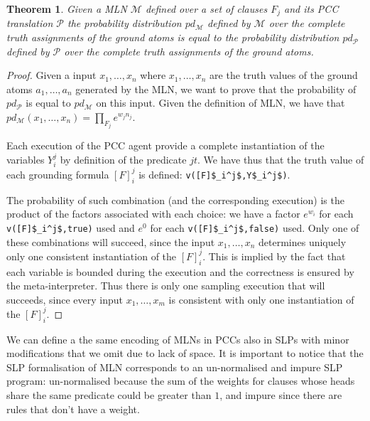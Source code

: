\documentclass[letterpaper]{article}
\theoremstyle{plain}
\newtheorem{theorem}{Theorem}[section]
\theoremstyle{definition}
\theoremstyle{remark}
\theoremstyle{definition}
\begin{document}
\begin{theorem}
Given a MLN $\mathcal{M}$ defined over a set of clauses $F_j$ and its PCC translation $\mathcal{P}$ 
the probability distribution $pd_{\mathcal{M}}$ defined by $\mathcal{M}$ over the complete truth assignments of the ground atoms  is equal to the probability distribution $pd_{\mathcal{P}}$ defined by $\mathcal{P}$ over the complete truth assignments of the ground atoms.
\end{theorem}
\begin{proof}
Given a input $x_1, \ldots ,x_n$ where $x_1, \ldots , x_n$ are the truth values of the ground atoms $a_1,\ldots, a_n$ generated by the MLN, we want to prove that the probability of $pd_{\mathcal{P}}$ is equal to $pd_{\mathcal{M}}$ on this input. Given the definition of MLN, we have that $pd_{\mathcal{M}}(x_1, \ldots ,x_n)=\prod_{F_j} e^{w_j n_j}$.

Each execution of the PCC agent provide a complete instantiation of the variables $Y_i^j$ by definition of the predicate $jt$. We have thus that the truth value of each grounding formula $[F]_i^j$ is defined: \lstinline[mathescape=true]{v([F]$_i^j$,Y$_i^j$)}. 

The probability of such combination (and the corresponding execution) is the product of the factors associated with each choice: we have a factor $e^{w_i}$ for each \lstinline[mathescape=true]{v([F]$_i^j$,true)} used and $e^0$ for each \lstinline[mathescape=true]{v([F]$_i^j$,false)} used. Only one of these combinations will succeed, since the input $x_1, \ldots ,x_n$ determines uniquely only one consistent instantiation of the $[F]_i^j$. This is implied by the fact that each variable is bounded during the execution and the correctness is ensured by the meta-interpreter.
Thus there is only one sampling execution that will succeeds, since every input $x_1,\ldots,x_m$ is consistent with only one instantiation of the $[F]_i^j$.
\end{proof}



We can define a the same encoding of MLNs in PCCs also in SLPs with minor modifications that we omit due to lack of space. It is important to notice that the SLP formalisation of MLN corresponds to an un-normalised and impure SLP program: un-normalised because the sum of the weights for clauses whose heads share the same predicate could be greater than $1$, and impure since there are rules that don't have a weight.
\end{document}
